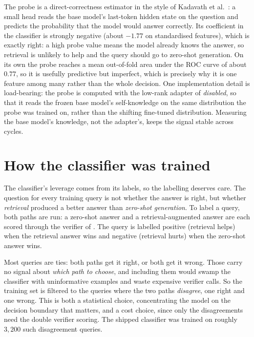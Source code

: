 \begin{precise}
The probe is a direct-correctness estimator in the style of
Kadavath et al.~\cite{kadavath2022language}: a small head reads the base model's
last-token hidden state on the question and predicts the probability that the model
would answer correctly. Its coefficient in the classifier is strongly negative
(about $-1.77$ on standardised features), which is exactly right: a high probe value
means the model already knows the answer, so retrieval is unlikely to help and the
query should go to zero-shot generation. On its own the probe reaches a mean
out-of-fold area under the ROC curve of about $0.77$, so it is usefully predictive but
imperfect, which is precisely why it is one feature among many rather than the whole
decision. One implementation detail is load-bearing:
the probe is computed with the low-rank adapter of  \emph{disabled}, so
that it reads the frozen base model's self-knowledge on the same distribution the
probe was trained on, rather than the shifting fine-tuned distribution. Measuring the
base model's knowledge, not the adapter's, keeps the signal stable across cycles.
\end{precise}

\section{How the classifier was trained}
\label{sec:ruc-training}

The classifier's leverage comes from its labels, so the labelling deserves care. The
question for every training query is not whether the answer is right, but whether
\emph{retrieval} produced a better answer than \emph{zero-shot generation}. To label a
query, both paths are run: a zero-shot answer and a retrieval-augmented answer are each
scored through the verifier of . The query is labelled positive
(retrieval helps) when the retrieval answer wins and negative (retrieval hurts) when the
zero-shot answer wins.

\begin{pitfall}
Most queries are ties: both paths get it right, or both get it wrong. Those carry no
signal about \emph{which path to choose}, and including them would swamp the classifier
with uninformative examples and waste expensive verifier calls. So the training set is
filtered to the queries where the two paths \emph{disagree}, one right and one wrong.
This is both a statistical choice, concentrating the model on the decision boundary that
matters, and a cost choice, since only the disagreements need the double verifier
scoring. The shipped classifier was trained on roughly $3{,}200$ such disagreement
queries.
\end{pitfall}

